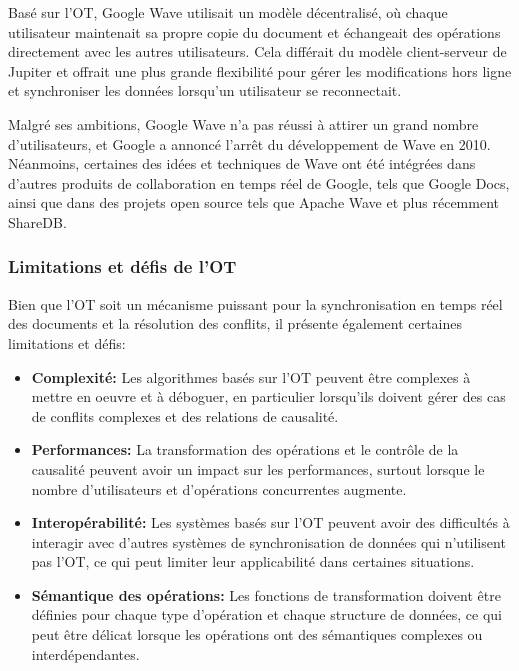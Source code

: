 Basé sur l'OT, Google Wave utilisait un modèle décentralisé, où chaque utilisateur maintenait sa propre copie du document et échangeait des opérations directement avec les autres utilisateurs. Cela différait du modèle client-serveur de Jupiter et offrait une plus grande flexibilité pour gérer les modifications hors ligne et synchroniser les données lorsqu'un utilisateur se reconnectait.

Malgré ses ambitions, Google Wave n'a pas réussi à attirer un grand nombre d'utilisateurs, et Google a annoncé l'arrêt du développement de Wave en 2010\cite{googlewaveend}. Néanmoins, certaines des idées et techniques de Wave ont été intégrées dans d'autres produits de collaboration en temps réel de Google, tels que Google Docs, ainsi que dans des projets open source tels que Apache Wave et plus récemment ShareDB\cite{apachewave, sharedb}.

\subsubsection{Limitations et défis de l'OT}

Bien que l'OT soit un mécanisme puissant pour la synchronisation en temps réel des documents et la résolution des conflits, il présente également certaines limitations et défis:

\begin{itemize}
    \item \textbf{Complexité:} Les algorithmes basés sur l'OT peuvent être complexes à mettre en oeuvre et à déboguer, en particulier lorsqu'ils doivent gérer des cas de conflits complexes et des relations de causalité.
    \item \textbf{Performances:} La transformation des opérations et le contrôle de la causalité peuvent avoir un impact sur les performances, surtout lorsque le nombre d'utilisateurs et d'opérations concurrentes augmente.
    \item \textbf{Interopérabilité:} Les systèmes basés sur l'OT peuvent avoir des difficultés à interagir avec d'autres systèmes de synchronisation de données qui n'utilisent pas l'OT, ce qui peut limiter leur applicabilité dans certaines situations.
    \item \textbf{Sémantique des opérations:} Les fonctions de transformation doivent être définies pour chaque type d'opération et chaque structure de données, ce qui peut être délicat lorsque les opérations ont des sémantiques complexes ou interdépendantes.
\end{itemize}

